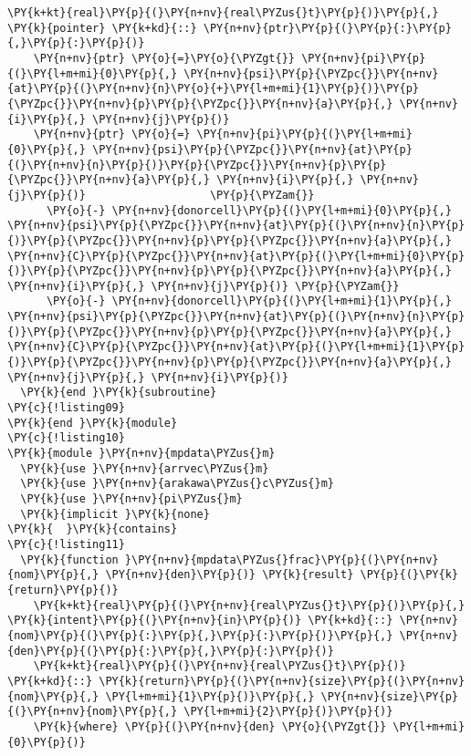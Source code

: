 \begin{Verbatim}[commandchars=\\\{\}]
    \PY{k+kt}{real}\PY{p}{(}\PY{n+nv}{real\PYZus{}t}\PY{p}{)}\PY{p}{,} \PY{k}{pointer} \PY{k+kd}{::} \PY{n+nv}{ptr}\PY{p}{(}\PY{p}{:}\PY{p}{,}\PY{p}{:}\PY{p}{)}
    \PY{n+nv}{ptr} \PY{o}{=}\PY{o}{\PYZgt{}} \PY{n+nv}{pi}\PY{p}{(}\PY{l+m+mi}{0}\PY{p}{,} \PY{n+nv}{psi}\PY{p}{\PYZpc{}}\PY{n+nv}{at}\PY{p}{(}\PY{n+nv}{n}\PY{o}{+}\PY{l+m+mi}{1}\PY{p}{)}\PY{p}{\PYZpc{}}\PY{n+nv}{p}\PY{p}{\PYZpc{}}\PY{n+nv}{a}\PY{p}{,} \PY{n+nv}{i}\PY{p}{,} \PY{n+nv}{j}\PY{p}{)}
    \PY{n+nv}{ptr} \PY{o}{=} \PY{n+nv}{pi}\PY{p}{(}\PY{l+m+mi}{0}\PY{p}{,} \PY{n+nv}{psi}\PY{p}{\PYZpc{}}\PY{n+nv}{at}\PY{p}{(}\PY{n+nv}{n}\PY{p}{)}\PY{p}{\PYZpc{}}\PY{n+nv}{p}\PY{p}{\PYZpc{}}\PY{n+nv}{a}\PY{p}{,} \PY{n+nv}{i}\PY{p}{,} \PY{n+nv}{j}\PY{p}{)}                   \PY{p}{\PYZam{}}
      \PY{o}{-} \PY{n+nv}{donorcell}\PY{p}{(}\PY{l+m+mi}{0}\PY{p}{,} \PY{n+nv}{psi}\PY{p}{\PYZpc{}}\PY{n+nv}{at}\PY{p}{(}\PY{n+nv}{n}\PY{p}{)}\PY{p}{\PYZpc{}}\PY{n+nv}{p}\PY{p}{\PYZpc{}}\PY{n+nv}{a}\PY{p}{,} \PY{n+nv}{C}\PY{p}{\PYZpc{}}\PY{n+nv}{at}\PY{p}{(}\PY{l+m+mi}{0}\PY{p}{)}\PY{p}{\PYZpc{}}\PY{n+nv}{p}\PY{p}{\PYZpc{}}\PY{n+nv}{a}\PY{p}{,} \PY{n+nv}{i}\PY{p}{,} \PY{n+nv}{j}\PY{p}{)} \PY{p}{\PYZam{}}
      \PY{o}{-} \PY{n+nv}{donorcell}\PY{p}{(}\PY{l+m+mi}{1}\PY{p}{,} \PY{n+nv}{psi}\PY{p}{\PYZpc{}}\PY{n+nv}{at}\PY{p}{(}\PY{n+nv}{n}\PY{p}{)}\PY{p}{\PYZpc{}}\PY{n+nv}{p}\PY{p}{\PYZpc{}}\PY{n+nv}{a}\PY{p}{,} \PY{n+nv}{C}\PY{p}{\PYZpc{}}\PY{n+nv}{at}\PY{p}{(}\PY{l+m+mi}{1}\PY{p}{)}\PY{p}{\PYZpc{}}\PY{n+nv}{p}\PY{p}{\PYZpc{}}\PY{n+nv}{a}\PY{p}{,} \PY{n+nv}{j}\PY{p}{,} \PY{n+nv}{i}\PY{p}{)}
  \PY{k}{end }\PY{k}{subroutine}
\PY{c}{!listing09}
\PY{k}{end }\PY{k}{module}
\PY{c}{!listing10}
\PY{k}{module }\PY{n+nv}{mpdata\PYZus{}m}
  \PY{k}{use }\PY{n+nv}{arrvec\PYZus{}m}
  \PY{k}{use }\PY{n+nv}{arakawa\PYZus{}c\PYZus{}m}
  \PY{k}{use }\PY{n+nv}{pi\PYZus{}m}
  \PY{k}{implicit }\PY{k}{none}
\PY{k}{  }\PY{k}{contains} 
\PY{c}{!listing11}
  \PY{k}{function }\PY{n+nv}{mpdata\PYZus{}frac}\PY{p}{(}\PY{n+nv}{nom}\PY{p}{,} \PY{n+nv}{den}\PY{p}{)} \PY{k}{result} \PY{p}{(}\PY{k}{return}\PY{p}{)}
    \PY{k+kt}{real}\PY{p}{(}\PY{n+nv}{real\PYZus{}t}\PY{p}{)}\PY{p}{,} \PY{k}{intent}\PY{p}{(}\PY{n+nv}{in}\PY{p}{)} \PY{k+kd}{::} \PY{n+nv}{nom}\PY{p}{(}\PY{p}{:}\PY{p}{,}\PY{p}{:}\PY{p}{)}\PY{p}{,} \PY{n+nv}{den}\PY{p}{(}\PY{p}{:}\PY{p}{,}\PY{p}{:}\PY{p}{)}
    \PY{k+kt}{real}\PY{p}{(}\PY{n+nv}{real\PYZus{}t}\PY{p}{)} \PY{k+kd}{::} \PY{k}{return}\PY{p}{(}\PY{n+nv}{size}\PY{p}{(}\PY{n+nv}{nom}\PY{p}{,} \PY{l+m+mi}{1}\PY{p}{)}\PY{p}{,} \PY{n+nv}{size}\PY{p}{(}\PY{n+nv}{nom}\PY{p}{,} \PY{l+m+mi}{2}\PY{p}{)}\PY{p}{)}
    \PY{k}{where} \PY{p}{(}\PY{n+nv}{den} \PY{o}{\PYZgt{}} \PY{l+m+mi}{0}\PY{p}{)}

\end{Verbatim}
